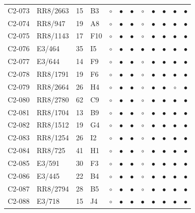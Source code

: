 {\begin{longtable}{llrp{3.9cm}cccccccc}
    C2-073 & RR8/2663 & 15 & B3 & $\circ$ & $\bullet$ & $\bullet$ & $\circ$ & $\bullet$ & $\bullet$ & $\bullet$ & $\bullet$ \\
    C2-074 & RR8/947 & 19 & A8 & $\circ$ & $\bullet$ & $\bullet$ & $\circ$ & $\bullet$ & $\bullet$ & $\bullet$ & $\bullet$ \\
    C2-075 & RR8/1143 & 17 & F10 & $\circ$ & $\bullet$ & $\bullet$ & $\circ$ & $\bullet$ & $\bullet$ & $\bullet$ & $\bullet$ \\
    C2-076 & E3/464 & 35 & I5 & $\circ$ & $\bullet$ & $\bullet$ & $\bullet$ & $\bullet$ & $\bullet$ & $\bullet$ & $\bullet$ \\
    C2-077 & E3/644 & 14 & F9 & $\circ$ & $\bullet$ & $\bullet$ & $\circ$ & $\bullet$ & $\bullet$ & $\bullet$ & $\bullet$ \\
    C2-078 & RR8/1791 & 19 & F6 & $\circ$ & $\bullet$ & $\bullet$ & $\circ$ & $\bullet$ & $\bullet$ & $\bullet$ & $\bullet$ \\
    C2-079 & RR8/2664 & 26 & H4 & $\circ$ & $\bullet$ & $\bullet$ & $\circ$ & $\bullet$ & $\bullet$ & $\circ$ & $\bullet$ \\
    C2-080 & RR8/2780 & 62 & C9 & $\circ$ & $\bullet$ & $\bullet$ & $\circ$ & $\bullet$ & $\bullet$ & $\bullet$ & $\bullet$ \\
    C2-081 & RR8/1704 & 13 & B9 & $\circ$ & $\bullet$ & $\bullet$ & $\circ$ & $\bullet$ & $\bullet$ & $\bullet$ & $\bullet$ \\
    C2-082 & RR8/1512 & 19 & G4 & $\circ$ & $\bullet$ & $\bullet$ & $\circ$ & $\bullet$ & $\bullet$ & $\bullet$ & $\bullet$ \\
    C2-083 & RR8/1254 & 26 & I2 & $\circ$ & $\bullet$ & $\bullet$ & $\circ$ & $\bullet$ & $\bullet$ & $\bullet$ & $\bullet$ \\
    C2-084 & RR8/725 & 41 & H1 & $\circ$ & $\bullet$ & $\bullet$ & $\circ$ & $\bullet$ & $\bullet$ & $\bullet$ & $\bullet$ \\
    C2-085 & E3/591 & 30 & F3 & $\circ$ & $\bullet$ & $\bullet$ & $\circ$ & $\bullet$ & $\bullet$ & $\bullet$ & $\bullet$ \\
    C2-086 & E3/445 & 22 & B4 & $\circ$ & $\bullet$ & $\bullet$ & $\circ$ & $\bullet$ & $\bullet$ & $\bullet$ & $\bullet$ \\
    C2-087 & RR8/2794 & 28 & B5 & $\circ$ & $\bullet$ & $\bullet$ & $\circ$ & $\bullet$ & $\bullet$ & $\bullet$ & $\bullet$ \\
    C2-088 & E3/718 & 15 & J4 & $\circ$ & $\bullet$ & $\bullet$ & $\bullet$ & $\bullet$ & $\bullet$ & $\bullet$ & $\bullet$ \\

\end{longtable}}
